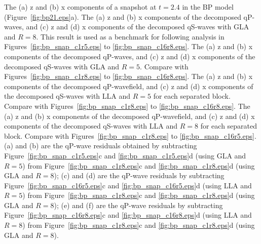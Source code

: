 \documentclass[manuscript,ulem,graphix,revised]{geophysics}
\begin{document}
{
The (a) z and (b) x components of a snapshot at $t=2.4$ in the BP model (Figure~\ref{fig:bp21.eps}a).
}
{
The (a) z and (b) x components of the decomposed qP-waves, and (c) z and (d) x components of the decomposed qS-waves with GLA and $R=8$. This result is used as a benchmark for following analysis in Figures~\ref{fig:bp_snap_c1r5.eps} to \ref{fig:bp_snap_c16r8.eps}.
}
{
The (a) z and (b) x components of the decomposed qP-waves, and (c) z and (d) x components of the decomposed qS-waves with GLA and $R=5$. Compare with Figures~\ref{fig:bp_snap_c1r8.eps} to \ref{fig:bp_snap_c16r8.eps}.
}
{
The (a) z and (b) x components of the decomposed qP-wavefield, and (c) z and (d) x components of the decomposed qS-waves with LLA and $R=5$ for each separated block. Compare with Figures~\ref{fig:bp_snap_c1r8.eps} to \ref{fig:bp_snap_c16r8.eps}.
}
{
The (a) z and (b) x components of the decomposed qP-wavefield, and (c) z and (d) x components of the decomposed qS-waves with LLA and $R=8$ for each separated block. Compare with Figures~\ref{fig:bp_snap_c1r8.eps} to \ref{fig:bp_snap_c16r5.eps}.
}
{
(a) and (b) are the qP-wave residuals obtained by subtracting Figure~\ref{fig:bp_snap_c1r5.eps}c and \ref{fig:bp_snap_c1r5.eps}d (using GLA and $R=5$) from Figure~\ref{fig:bp_snap_c1r8.eps}c and \ref{fig:bp_snap_c1r8.eps}d (using GLA and $R=8$); 
(c) and (d) are the qP-wave residuals by subtracting Figure~\ref{fig:bp_snap_c16r5.eps}c and \ref{fig:bp_snap_c16r5.eps}d (using LLA and $R=5$) from Figure~\ref{fig:bp_snap_c1r8.eps}c and \ref{fig:bp_snap_c1r8.eps}d (using GLA and $R=8$);
(e) and (f) are the qP-wave residuals by subtracting Figure~\ref{fig:bp_snap_c16r8.eps}c and \ref{fig:bp_snap_c16r8.eps}d (using LLA and $R=8$) from Figure~\ref{fig:bp_snap_c1r8.eps}c and \ref{fig:bp_snap_c1r8.eps}d (using GLA and $R=8$).
}
\end{document}
